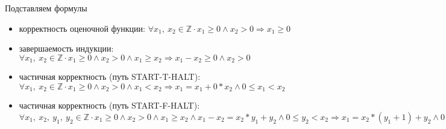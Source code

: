 \documentclass[hyperref={unicode=true}]{beamer}
\begin{document}
    \begin{frame}{Подставляем формулы}
    \begin{itemize}
    \item корректность оценочной функции:
            $\forall x_1,~x_2 \in \mathbb{Z} \cdot
            x_1 \geq 0 \land x_2 > 0
            \Rightarrow
            x_1 \geq 0$
    \item завершаемость индукции:
            $\forall x_1,~x_2 \in \mathbb{Z} \cdot
            x_1 \geq 0 \land x_2 > 0 \land x_1 \geq x_2
            \Rightarrow
            x_1 - x_2 \geq 0 \land x_2 > 0$
    \item частичная корректность (путь START-T-HALT):
            $\forall x_1,~x_2 \in \mathbb{Z} \cdot
            x_1 \geq 0 \land x_2 > 0 \land x_1 < x_2
            \Rightarrow
            x_1 = x_1 + 0 * x_2 \land 0 \leq x_1 < x_2$
    \item частичная корректность (путь START-F-HALT):
            $\forall x_1,~x_2,~y_1,~y_2 \in \mathbb{Z} \cdot
            x_1 \geq 0 \land x_2 > 0 \land x_1 \geq x_2 \land
            x_1 - x_2 = x_2 * y_1 + y_2 \land 0 \leq y_2 < x_2
            \Rightarrow
            x_1 = x_2 * (y_1 + 1) + y_2 \land 0 \leq y_2 < x_2$
    \end{itemize}
    \end{frame}
\end{document}
